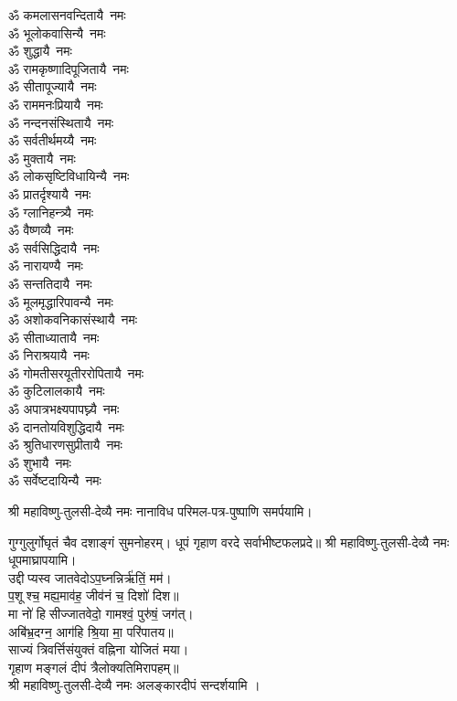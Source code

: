 \begin{multicols}{2}
\begin{flushleft}
ॐ कमलासनवन्दितायै~नमः\\
ॐ भूलोकवासिन्यै~नमः\\
ॐ शुद्धायै~नमः\\
ॐ रामकृष्णादिपूजितायै~नमः\\
ॐ सीतापूज्यायै~नमः\\
ॐ राममनःप्रियायै~नमः\\
ॐ नन्दनसंस्थितायै~नमः\\
ॐ सर्वतीर्थमय्यै~नमः\\
ॐ मुक्तायै~नमः\hfill{}‌\\
ॐ लोकसृष्टिविधायिन्यै~नमः\\
ॐ प्रातर्दृश्यायै~नमः\\
ॐ ग्लानिहन्त्र्यै~नमः\\
ॐ वैष्णव्यै~नमः\\
ॐ सर्वसिद्धिदायै~नमः\\
ॐ नारायण्यै~नमः\\
ॐ सन्ततिदायै~नमः\\
ॐ मूलमृद्धारिपावन्यै~नमः\\
ॐ अशोकवनिकासंस्थायै~नमः\\
ॐ सीताध्यातायै~नमः\hfill{}‌\\
ॐ निराश्रयायै~नमः\\
ॐ गोमतीसरयूतीररोपितायै~नमः\\
ॐ कुटिलालकायै~नमः\\
ॐ अपात्रभक्ष्यपापघ्न्यै~नमः\\
ॐ दानतोयविशुद्धिदायै~नमः\\
ॐ श्रुतिधारणसुप्रीतायै~नमः\\
ॐ शुभायै~नमः\\
ॐ सर्वेष्टदायिन्यै~नमः\hfill{}\\
\end{flushleft}
\end{multicols}
श्री महाविष्णु-तुलसी-देव्यै नमः नानाविध परिमल-पत्र-पुष्पाणि समर्पयामि।


गुग्गुलुर्गोघृतं चैव दशाङ्गं सुमनोहरम्।
धूपं गृहाण वरदे सर्वाभीष्टफलप्रदे॥
श्री महाविष्णु-तुलसी-देव्यै नमः धूपमाघ्रापयामि।\\

उद्दीप्यस्व जातवेदोऽप॒घ्नन्निर्ऋ॑तिं॒ मम॑।\\
 प॒शूश्च॒ मह्य॒माव॑ह॒ जीव॑नं च॒ दिशो॑ दिश॥ \\
मा नो॑ हिसीज्जातवेदो॒ गामश्वं॒ पुरु॑षं॒ जग॑त्।\\
अबि॑भ्र॒दग्न॒ आग॑हि श्रि॒या मा॒ परि॑पातय॥ \\
साज्यं त्रिवर्त्तिसंयुक्तं वह्निना योजितं मया।\\
गृहाण मङ्गलं दीपं त्रैलोक्यतिमिरापहम्॥ \\
श्री महाविष्णु-तुलसी-देव्यै नमः अलङ्कारदीपं सन्दर्शयामि ।\\

